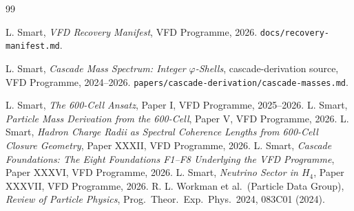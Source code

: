 \documentclass[12pt]{article}
\theoremstyle{definition}
\theoremstyle{remark}
\begin{document}

\begin{thebibliography}{99}

 L. Smart, \emph{VFD Recovery Manifest}, VFD Programme, 2026. \texttt{docs/recovery-manifest.md}.

 L. Smart, \emph{Cascade Mass Spectrum: Integer $\varphi$-Shells}, cascade-derivation source, VFD Programme, 2024--2026. \texttt{papers/cascade-derivation/cascade-masses.md}.

 L. Smart, \emph{The 600-Cell Ansatz}, Paper I, VFD Programme, 2025--2026.
 L. Smart, \emph{Particle Mass Derivation from the 600-Cell}, Paper V, VFD Programme, 2026.
 L. Smart, \emph{Hadron Charge Radii as Spectral Coherence Lengths from 600-Cell Closure Geometry}, Paper XXXII, VFD Programme, 2026.
 L. Smart, \emph{Cascade Foundations: The Eight Foundations F1--F8 Underlying the VFD Programme}, Paper XXXVI, VFD Programme, 2026.
 L. Smart, \emph{Neutrino Sector in $H_4$}, Paper XXXVII, VFD Programme, 2026.
 R. L. Workman et al.\ (Particle Data Group), \emph{Review of Particle Physics}, Prog.\ Theor.\ Exp.\ Phys.\ 2024, 083C01 (2024).

\end{thebibliography}
\end{document}
